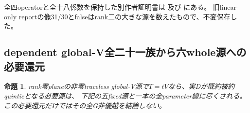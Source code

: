 \documentclass[a4paper,11pt]{ltjsarticle}
\newtheorem{proposition}{命題}[section]
\theoremstyle{definition}
\begin{document}
全四operatorと全十八係数を保持した別作者証明書は
及び
にある。
旧linear-only reportの像31/30とfalseはrank二の大きな源を数えたもので、不変保存した。

\subsection{dependent global-V全二十一族から六whole源への必要還元}
\begin{proposition}\label{prop:plane-dependent-six-entrance}
rank零planeの非零traceless global-V源で$T=tV$なら、実Dが既約被約quinticとなる必要源は、
下記の五fixed源と一本の全parameter線に尽くされる。この必要還元だけではその全G非優越を結論しない。
\end{proposition}
\end{document}
